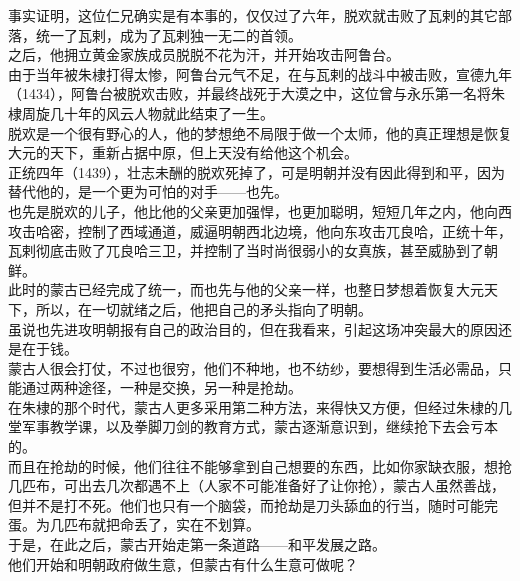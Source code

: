 \begin{multicols}{\theparacolNo}
事实证明，这位仁兄确实是有本事的，仅仅过了六年，脱欢就击败了瓦剌的其它部落，统一了瓦剌，成为了瓦剌独一无二的首领。\\

之后，他拥立黄金家族成员脱脱不花为汗，并开始攻击阿鲁台。\\

由于当年被朱棣打得太惨，阿鲁台元气不足，在与瓦剌的战斗中被击败，宣德九年（1434），阿鲁台被脱欢击败，并最终战死于大漠之中，这位曾与永乐第一名将朱棣周旋几十年的风云人物就此结束了一生。\\

脱欢是一个很有野心的人，他的梦想绝不局限于做一个太师，他的真正理想是恢复大元的天下，重新占据中原，但上天没有给他这个机会。\\

正统四年（1439），壮志未酬的脱欢死掉了，可是明朝并没有因此得到和平，因为替代他的，是一个更为可怕的对手——也先。\\

也先是脱欢的儿子，他比他的父亲更加强悍，也更加聪明，短短几年之内，他向西攻击哈密，控制了西域通道，威逼明朝西北边境，他向东攻击兀良哈，正统十年，瓦剌彻底击败了兀良哈三卫，并控制了当时尚很弱小的女真族，甚至威胁到了朝鲜。\\

此时的蒙古已经完成了统一，而也先与他的父亲一样，也整日梦想着恢复大元天下，所以，在一切就绪之后，他把自己的矛头指向了明朝。\\

虽说也先进攻明朝报有自己的政治目的，但在我看来，引起这场冲突最大的原因还是在于钱。\\

蒙古人很会打仗，不过也很穷，他们不种地，也不纺纱，要想得到生活必需品，只能通过两种途径，一种是交换，另一种是抢劫。\\

在朱棣的那个时代，蒙古人更多采用第二种方法，来得快又方便，但经过朱棣的几堂军事教学课，以及拳脚刀剑的教育方式，蒙古逐渐意识到，继续抢下去会亏本的。\\

而且在抢劫的时候，他们往往不能够拿到自己想要的东西，比如你家缺衣服，想抢几匹布，可出去几次都遇不上（人家不可能准备好了让你抢），蒙古人虽然善战，但并不是打不死。他们也只有一个脑袋，而抢劫是刀头舔血的行当，随时可能完蛋。为几匹布就把命丢了，实在不划算。\\

于是，在此之后，蒙古开始走第一条道路——和平发展之路。\\

他们开始和明朝政府做生意，但蒙古有什么生意可做呢？\\


\end{multicols}
